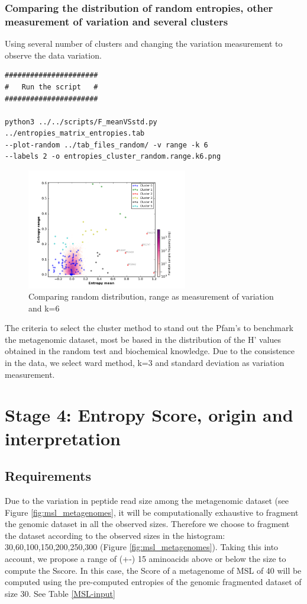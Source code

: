 \documentclass[12pt]{report}
\begin{document}
\subsubsection{Comparing the distribution of random entropies, other measurement of variation and several clusters}
Using several number of clusters and changing the variation measurement to observe the data variation. 
\begin{verbatim}
######################
#   Run the script   #
######################

python3 ../../scripts/F_meanVSstd.py  ../entropies_matrix_entropies.tab 
--plot-random ../tab_files_random/ -v range -k 6
--labels 2 -o entropies_cluster_random.range.k6.png

\end{verbatim}
\begin{figure}[H]
  \centering
    \includegraphics[width=70mm, scale=1]{entropies_cluster_random_range_k6.png}
    \caption{Comparing random distribution, range as measurement of variation and k=6}
        \label{fig:range_random}
\end{figure}

The criteria to select the cluster method to stand out the Pfam’s to benchmark the metagenomic dataset,  most be based in the distribution of the H’ values obtained in the random test and biochemical knowledge. Due to the consistence in the data, we select ward method, k=3 and standard deviation as variation measurement. 

\section{Stage 4: Entropy Score, origin and interpretation}

\subsection{Requirements}

Due to the variation in peptide read size among the metagenomic dataset (see Figure \ref{fig:msl_metagenomes}, it will be computationally exhaustive to fragment the genomic dataset in all the observed sizes. Therefore we choose to fragment the dataset according to the observed sizes in the histogram: 30,60,100,150,200,250,300 (Figure \ref{fig:msl_metagenomes}). Taking this into account, we propose a range of (+-) 15 aminoacids above or below the size to compute the Sscore. In this case, the Score of  a metagenome of MSL of 40 will be computed using the pre-computed entropies of the genomic fragmented dataset of size 30. See Table \ref{MSL-input}
\end{document}
